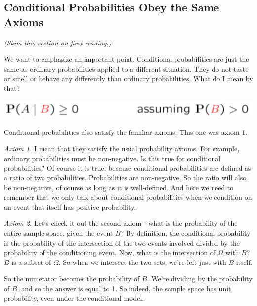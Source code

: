 \documentclass{tufte-handout}
\begin{document}
\vspace{0.4cm}
\subsection{Conditional Probabilities Obey the Same Axioms}\label{sec:CondAxioms}

\textit{(Skim this section on first reading.)}

\vspace{0.4cm}

\noindent We want to emphasize an important point. Conditional probabilities are just the same as ordinary
probabilities applied to a different situation. They do not taste or smell or behave any differently than
ordinary probabilities. What do I mean by that?


\vspace{0.2cm}


\begin{marginfigure}
  \includegraphics{CondProbAx1}
  \caption{Conditional probabilities also satisfy the familiar axioms. This one was axiom 1.}
\end{marginfigure}

\textit{Axiom 1.} I mean that they satisfy the usual probability axioms. For example, ordinary probabilities must be
non-negative. Is this true for conditional probabilities? Of course it is true, because conditional
probabilities are defined as a ratio of two probabilities. Probabilities are non-negative. So the ratio will
also be non-negative, of course as long as it is well-defined. And here we need to remember that we
only talk about conditional probabilities when we condition on an event that itself has positive
probability.

\vspace{0.2cm}

\textit{Axiom 2.} Let's check it out the second axiom - what is the probability of the entire sample space, given the event $B$?  
By definition, the conditional probability is the probability of the intersection of the two
events involved divided by the probability of the conditioning event. Now, what is the intersection of
$\Omega$ with $B$? $B$ is a subset of $\Omega$. So when we intersect the two sets, we're left just with $B$ itself.


So the numerator becomes the probability of $B$. We're dividing by the probability of $B$, and so the
answer is equal to 1. So indeed, the sample space has unit probability, even under the conditional
model.
\end{document}
